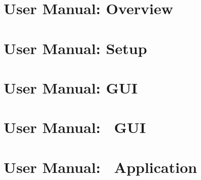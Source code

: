 \chapter[DABC User Manual: Overview]{\dabc\ User Manual: Overview}
 \cleardoublepage
\chapter[DABC User Manual: Setup]{\dabc\ User Manual: Setup}
 \cleardoublepage
\chapter[DABC User Manual: GUI]{\dabc\ User Manual: GUI}
 \cleardoublepage
\chapter[DABC User Manual: MBS GUI]{\dabc\ User Manual: \mbs\ GUI}
 \cleardoublepage
\chapter[DABC User Manual: DABC Application MBS]{\dabc\ User Manual: \dabc\ Application \mbs}
 \cleardoublepage

